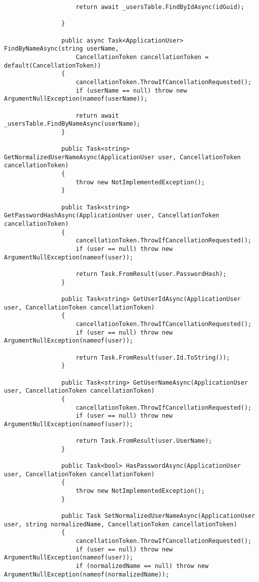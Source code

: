 \documentclass{report}
\begin{document}
\begin{lstlisting}
                    return await _usersTable.FindByIdAsync(idGuid);

                }

                public async Task<ApplicationUser> FindByNameAsync(string userName, 
                    CancellationToken cancellationToken = default(CancellationToken))
                {
                    cancellationToken.ThrowIfCancellationRequested();
                    if (userName == null) throw new ArgumentNullException(nameof(userName));

                    return await _usersTable.FindByNameAsync(userName);
                }

                public Task<string> GetNormalizedUserNameAsync(ApplicationUser user, CancellationToken cancellationToken)
                {
                    throw new NotImplementedException();
                }

                public Task<string> GetPasswordHashAsync(ApplicationUser user, CancellationToken cancellationToken)
                {
                    cancellationToken.ThrowIfCancellationRequested();
                    if (user == null) throw new ArgumentNullException(nameof(user));

                    return Task.FromResult(user.PasswordHash);
                }

                public Task<string> GetUserIdAsync(ApplicationUser user, CancellationToken cancellationToken)
                {
                    cancellationToken.ThrowIfCancellationRequested();
                    if (user == null) throw new ArgumentNullException(nameof(user));

                    return Task.FromResult(user.Id.ToString());
                }

                public Task<string> GetUserNameAsync(ApplicationUser user, CancellationToken cancellationToken)
                {
                    cancellationToken.ThrowIfCancellationRequested();
                    if (user == null) throw new ArgumentNullException(nameof(user));

                    return Task.FromResult(user.UserName);
                }

                public Task<bool> HasPasswordAsync(ApplicationUser user, CancellationToken cancellationToken)
                {
                    throw new NotImplementedException();
                }

                public Task SetNormalizedUserNameAsync(ApplicationUser user, string normalizedName, CancellationToken cancellationToken)
                {
                    cancellationToken.ThrowIfCancellationRequested();
                    if (user == null) throw new ArgumentNullException(nameof(user));
                    if (normalizedName == null) throw new ArgumentNullException(nameof(normalizedName));


\end{lstlisting}
\end{document}

